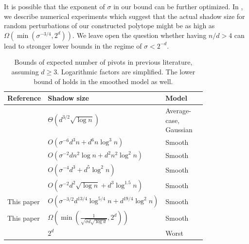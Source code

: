 \documentclass{article}\usepackage[a4paper,margin=20mm]{geometry}
\begin{document}
It is possible that the exponent of $\sigma$ in our bound can be further optimized.
In , we describe numerical experiments which suggest that
the actual shadow size for random perturbations of our constructed polytope might be as high as $\Omega(\min(\sigma^{-3/4}, 2^d))$.
We leave open the question whether having $n/d > 4$ can lead to stronger
lower bounds in the regime of $\sigma < 2^{-d}$.


\begin{table}[h!]
  \begin{center}
  \renewcommand{\arraystretch}{1.6}
    \begin{tabular}{|l|l|l|l|} %
        \hline
        {\bf Reference} & {\bf Shadow size} & {\bf Model} \\
        \hline
        \cite{b87} & $\Theta(d^{3/2}\sqrt{\log n})$ & \makecell[l]{Average-\\ case,\\ Gaussian } \\ 
        \hline
        \hline
        \cite{ST04} & $O(\sigma^{-6}d^3n + d^6n\log^3 n)$ & Smooth \\
        \hline
        \cite{ds05} & $O(\sigma^{-2}dn^2\log n + d^2n^2\log^2 n)$ & Smooth \\
        \hline
        \cite{ver09} & $O(\sigma^{-4}d^3 + d^5\log^2n)$ & Smooth \\
        \hline
        \cite{DH18} & $O(\sigma^{-2}d^2\sqrt{\log n}+ d^{3}\log ^{1.5}n)$ & Smooth \\
        \hline
        This paper & $O(\sigma^{-3/2} d^{13/4} \log^{5/4} n + d^{19/4} \log^{2} n)$ & Smooth \\
        \hline
        \hline
        This paper & $\Omega(\min(\frac{1}{\sqrt{\sigma d \sqrt{\log d}}},2^d))$ & Smooth \\
        \hline
        \cite{zad73,Mur80,report/Goldfarb83} & $2^d$ & Worst \\
        \hline
    \end{tabular}
    \caption{Bounds of expected number of pivots in previous literature, assuming $d \geq 3$. Logarithmic factors are simplified. The lower bound of \cite{b87} holds in the smoothed model as well.}\label{tab:shadow_history}
  \end{center}
\end{table}
\end{document}

